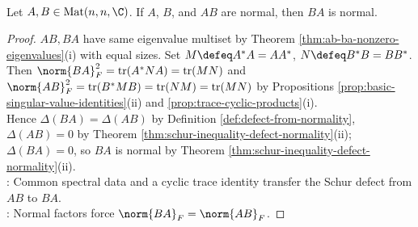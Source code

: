 \begin{theorem} \label{thm:normality-transfer-ab-ba} \\
Let $A,B\in\operatorname{Mat}(n,n,\C)$. If $A$, $B$, and $AB$ are normal, then $BA$ is normal.
\begin{proof} $AB, BA$ have same eigenvalue multiset by Theorem \ref{thm:ab-ba-nonzero-eigenvalues}(i) with equal sizes. Set $M\defeq A^*A=AA^*$, $N\defeq B^*B=BB^*$.\\
Then $\norm{BA}_F^2=\operatorname{tr}(A^*NA)=\operatorname{tr}(MN)$ and $\norm{AB}_F^2=\operatorname{tr}(B^*MB)=\operatorname{tr}(NM)=\operatorname{tr}(MN)$ by Propositions \ref{prop:basic-singular-value-identities}(ii) and \ref{prop:trace-cyclic-products}(i).\\
Hence $\Delta(BA)=\Delta(AB)$ by Definition \ref{def:defect-from-normality}, $\Delta(AB)=0$ by Theorem \ref{thm:schur-inequality-defect-normality}(ii); $\Delta(BA)=0$, so $BA$ is normal by Theorem \ref{thm:schur-inequality-defect-normality}(ii).\\
: Common spectral data and a cyclic trace identity transfer the Schur defect from $AB$ to $BA$.\\
: Normal factors force $\norm{BA}_F=\norm{AB}_F$.
\end{proof}
\end{theorem}

